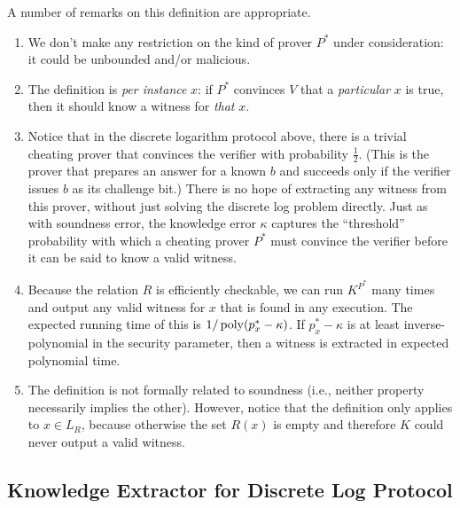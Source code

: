 \documentclass[11pt]{article}
\begin{document}
\begin{remark}
  \label{rem:pok}
  A number of remarks on this definition are appropriate.

  \begin{enumerate}

  \item We don't make any restriction on the kind of prover $P^{*}$
    under consideration: it could be unbounded and/or malicious.

  \item The definition is \emph{per instance} $x$: if $P^{*}$
    convinces $V$ that a \emph{particular} $x$ is true, then it should
    know a witness for \emph{that} $x$.

  \item Notice that in the discrete logarithm protocol above, there is
    a trivial cheating prover that convinces the verifier with
    probability $\frac{1}{2}$.  (This is the prover that prepares an
    answer for a known $b$ and succeeds only if the verifier issues
    $b$ as its challenge bit.)  There is no hope of extracting any
    witness from this prover, without just solving the discrete log
    problem directly.  Just as with soundness error, the knowledge
    error $\kappa$ captures the ``threshold'' probability with which a
    cheating prover $P^{*}$ must convince the verifier before it can
    be said to know a valid witness.

  \item Because the relation $R$ is efficiently checkable, we can run
    $K^{P^{*}}$ many times and output any valid witness for $x$ that
    is found in any execution.  The expected running time of this is
    $1/\operatorname{poly}(p^{*}_{x} - \kappa)$.  If $p^{*}_{x}-\kappa$ is at least
    inverse-polynomial in the security parameter, then a witness is
    extracted in expected polynomial time.

  \item The definition is not formally related to soundness (i.e.,
    neither property necessarily implies the other).  However, notice
    that the definition only applies to $x \in L_{R}$, because
    otherwise the set $R(x)$ is empty and therefore $K$ could never
    output a valid witness.
  \end{enumerate}
\end{remark}

\subsection{Knowledge Extractor for Discrete Log Protocol}
\label{sec:knowl-extr-discr}
\end{document}
